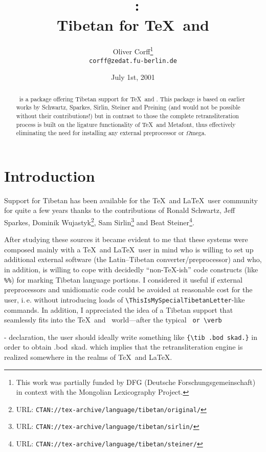 \documentclass[a4paper,11pt]{article}
\title{\TibTeX\ \CtibVersionRelease:\\Tibetan for \TeX\ and \LaTeXe}
\author{Oliver Corff\thanks{This work was partially funded by
	DFG (Deutsche Forschungsgemeinschaft) in context with
	the Mongolian Lexicography Project.}\\
	\texttt{corff@zedat.fu-berlin.de}}
\date{July 1st, 2001}
\begin{document}
\maketitle
\begin{abstract}
	\TibTeX\ is a package offering Tibetan support for \TeX\ and
	\LaTeXe.  This package is based on earlier works by Schwartz,
	Sparkes, Sirlin, Steiner and Preining
	(and would not be possible without their contributions!) but in
	contrast to those the complete retransliteration process is
	built on the ligature functionality of \TeX\ and Metafont, thus
	effectively eliminating the need for installing any external
	preprocessor or $\Omega$mega.
\end{abstract}
\tableofcontents

\section{Introduction}

Support for Tibetan has been available for the \TeX\ and \LaTeX\
user community for quite a few years thanks to the contributions of 
Ronald Schwartz, Jeff Sparkes, Dominik Wujastyk\footnote{URL:
	\texttt{CTAN://tex-archive/language/tibetan/original/}},
Sam Sirlin\footnote{URL: 
	\texttt{CTAN://tex-archive/language/tibetan/sirlin/}}
and
Beat Steiner\footnote{URL:
	\texttt{CTAN://tex-archive/language/tibetan/steiner/}}.

\begin{sloppypar}
After studying these sources it became evident to me that these systems
were composed mainly with a \TeX\ and \LaTeX\ user in mind who is willing
to set up additional external software (the Latin--Tibetan
converter/preprocessor) and who, in addition, is willing to cope with
 decidedly ``non-\TeX-ish'' code constructs (like \verb-%%-) for marking
Tibetan language portions. I considered it useful if external preprocessors and 
unidiomatic code could be avoided at reasonable cost for the user,
i.\,e. without introducing loads of \verb-\ThisIsMySpecialTibetanLetter--like
commands. In addition, I appreciated the idea of a Tibetan support that
seamlessly fits into the \TeX\ and \LaTeXe\ world---after the typical
\verb*- or \verb-\usepackage{...}- declaration, the user should
ideally write something like \verb-{\tib .bod skad.}- in order to obtain
\hbox{\tib .bod skad.} which implies that the retransliteration engine
is realized somewhere in the realms of \TeX\ and \LaTeX. 
\end{sloppypar}
\end{document}
